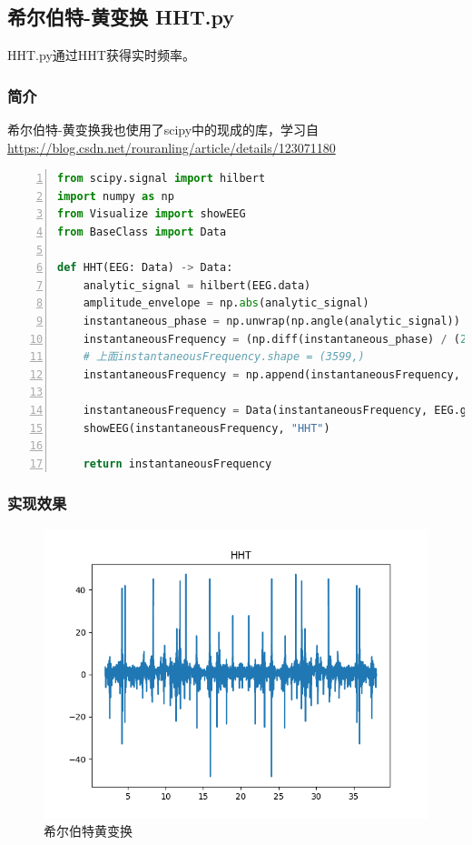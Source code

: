\documentclass[cs4size,a4paper]{ctexart}
\numberwithin{equation}{section}
\numberwithin{table}{section}
\numberwithin{figure}{section}
\begin{document}
\subsection{希尔伯特-黄变换 HHT.py}

\colorbox{LetMeFlyGray}{HHT.py}通过HHT获得实时频率。

\subsubsection{简介}

希尔伯特-黄变换我也使用了scipy中的现成的库，学习自\url{https://blog.csdn.net/rouranling/article/details/123071180}

\begin{lstlisting}[language={python},
numbers=left,
numberstyle=\tiny\monaco,
basicstyle=\footnotesize\monaco]
from scipy.signal import hilbert
import numpy as np
from Visualize import showEEG
from BaseClass import Data

def HHT(EEG: Data) -> Data:
    analytic_signal = hilbert(EEG.data)
    amplitude_envelope = np.abs(analytic_signal)
    instantaneous_phase = np.unwrap(np.angle(analytic_signal))
    instantaneousFrequency = (np.diff(instantaneous_phase) / (2.0 * np.pi) * EEG.getFPS())
    # 上面instantaneousFrequency.shape = (3599,)
    instantaneousFrequency = np.append(instantaneousFrequency, 0)

    instantaneousFrequency = Data(instantaneousFrequency, EEG.getStartTime(), EEG.getFPS())
    showEEG(instantaneousFrequency, "HHT")

    return instantaneousFrequency
\end{lstlisting}

\subsubsection{实现效果}

\begin{figure}[H]
\small
\centering
\includegraphics[width=\textwidth]{HHT.png}
\caption{希尔伯特黄变换} \label{fig:HHT}
\end{figure}
\end{document}
